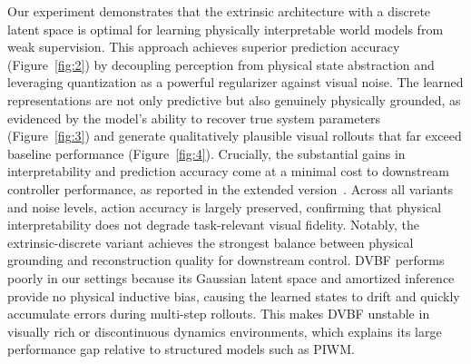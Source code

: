 \documentclass[nonacm,sigconf]{acmart}
\begin{document}
Our experiment demonstrates that the extrinsic architecture with a discrete latent space is optimal for learning physically interpretable world models from weak supervision. This approach achieves superior prediction accuracy (Figure~\ref{fig:2}) by decoupling perception from physical state abstraction and leveraging quantization as a powerful regularizer against visual noise. The learned representations are not only predictive but also genuinely physically grounded, as evidenced by the model's ability to recover true system parameters (Figure~\ref{fig:3}) and generate qualitatively plausible visual rollouts that far exceed baseline performance (Figure~\ref{fig:4}). Crucially, the substantial gains in interpretability and prediction accuracy come at a minimal cost to downstream controller performance, as reported in the extended version~\cite{extended}. Across all variants and noise levels, action accuracy is largely preserved, confirming that physical interpretability does not degrade task-relevant visual fidelity. Notably, the extrinsic-discrete variant achieves the strongest balance between physical grounding and reconstruction quality for downstream control. DVBF performs poorly in our settings because its Gaussian latent space and amortized inference provide no physical inductive bias, causing the learned states to drift and quickly accumulate errors during multi-step rollouts. This makes DVBF unstable in visually rich or discontinuous dynamics environments, which explains its large performance gap relative to structured models such as PIWM.
\end{document}
